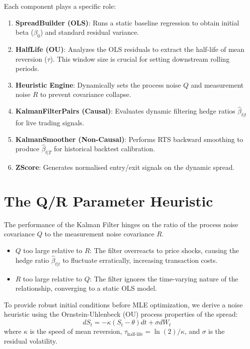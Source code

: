 \documentclass[10pt,a4paper,twocolumn]{article}
\newcommand{\tauhl}{\tau_{\text{half-life}}}
\begin{document}
Each component plays a specific role:
\begin{enumerate}\setlength\itemsep{0pt}
  \item \textbf{SpreadBuilder (OLS)}: Runs a static baseline regression to obtain initial beta ($\beta_0$) and standard residual variance.
  \item \textbf{HalfLife (OU)}: Analyzes the OLS residuals to extract the half-life of mean reversion ($\tau$). This window size is crucial for setting downstream rolling periods.
  \item \textbf{Heuristic Engine}: Dynamically sets the process noise $Q$ and measurement noise $R$ to prevent covariance collapse.
  \item \textbf{KalmanFilterPairs (Causal)}: Evaluates dynamic filtering hedge ratios $\hat{\beta}_{t|t}$ for live trading signals.
  \item \textbf{KalmanSmoother (Non-Causal)}: Performs RTS backward smoothing to produce $\hat{\beta}_{t|T}$ for historical backtest calibration.
  \item \textbf{ZScore}: Generates normalised entry/exit signals on the dynamic spread.
\end{enumerate}

\section{The Q/R Parameter Heuristic}

The performance of the Kalman Filter hinges on the ratio of the process noise covariance $Q$ to the measurement noise covariance $R$.
\begin{itemize}
  \item $Q$ too large relative to $R$: The filter overreacts to price shocks, causing the hedge ratio $\hat{\beta}_{t|t}$ to fluctuate erratically, increasing transaction costs.
  \item $R$ too large relative to $Q$: The filter ignores the time-varying nature of the relationship, converging to a static OLS model.
\end{itemize}

To provide robust initial conditions before MLE optimization, we derive a noise heuristic using the Ornstein-Uhlenbeck (OU) process properties of the spread:
\[
  d S_t = -\kappa (S_t - \theta) dt + \sigma dW_t
\]
where $\kappa$ is the speed of mean reversion, $\tauhl = \ln(2)/\kappa$, and $\sigma$ is the residual volatility.
\end{document}
